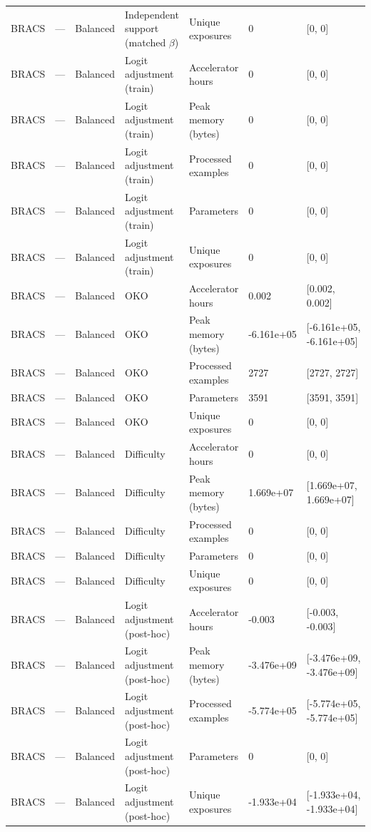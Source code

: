 \begin{longtable}{lllllll}
BRACS & --- & Balanced & Independent support (matched $\beta$) & Unique exposures & 0 & [0, 0] \\
BRACS & --- & Balanced & Logit adjustment (train) & Accelerator hours & 0 & [0, 0] \\
BRACS & --- & Balanced & Logit adjustment (train) & Peak memory (bytes) & 0 & [0, 0] \\
BRACS & --- & Balanced & Logit adjustment (train) & Processed examples & 0 & [0, 0] \\
BRACS & --- & Balanced & Logit adjustment (train) & Parameters & 0 & [0, 0] \\
BRACS & --- & Balanced & Logit adjustment (train) & Unique exposures & 0 & [0, 0] \\
BRACS & --- & Balanced & OKO & Accelerator hours & 0.002 & [0.002, 0.002] \\
BRACS & --- & Balanced & OKO & Peak memory (bytes) & -6.161e+05 & [-6.161e+05, -6.161e+05] \\
BRACS & --- & Balanced & OKO & Processed examples & 2727 & [2727, 2727] \\
BRACS & --- & Balanced & OKO & Parameters & 3591 & [3591, 3591] \\
BRACS & --- & Balanced & OKO & Unique exposures & 0 & [0, 0] \\
BRACS & --- & Balanced & Difficulty & Accelerator hours & 0 & [0, 0] \\
BRACS & --- & Balanced & Difficulty & Peak memory (bytes) & 1.669e+07 & [1.669e+07, 1.669e+07] \\
BRACS & --- & Balanced & Difficulty & Processed examples & 0 & [0, 0] \\
BRACS & --- & Balanced & Difficulty & Parameters & 0 & [0, 0] \\
BRACS & --- & Balanced & Difficulty & Unique exposures & 0 & [0, 0] \\
BRACS & --- & Balanced & Logit adjustment (post-hoc) & Accelerator hours & -0.003 & [-0.003, -0.003] \\
BRACS & --- & Balanced & Logit adjustment (post-hoc) & Peak memory (bytes) & -3.476e+09 & [-3.476e+09, -3.476e+09] \\
BRACS & --- & Balanced & Logit adjustment (post-hoc) & Processed examples & -5.774e+05 & [-5.774e+05, -5.774e+05] \\
BRACS & --- & Balanced & Logit adjustment (post-hoc) & Parameters & 0 & [0, 0] \\
BRACS & --- & Balanced & Logit adjustment (post-hoc) & Unique exposures & -1.933e+04 & [-1.933e+04, -1.933e+04] \\

\end{longtable}
